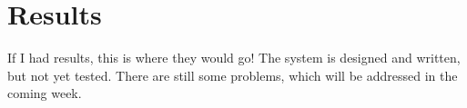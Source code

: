 \chapter{Results}

If I had results, this is where they would go! The system is designed and written, but not yet tested. There are still some problems, which will be addressed in the coming week. 